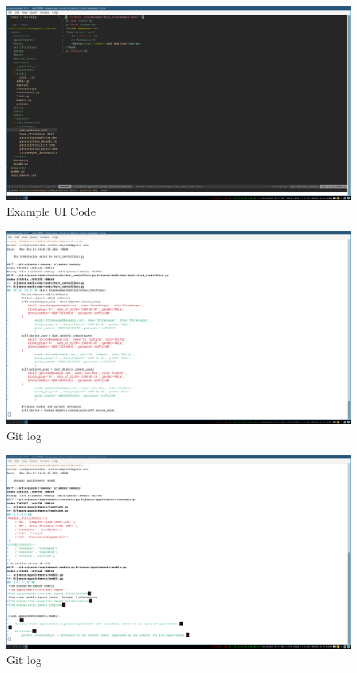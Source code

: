 \documentclass[a4paper,12pt]{article}
\begin{document}
\begin{figure}[H]
    \centering
    \includegraphics[width=1\textwidth]{images/meet202.png}   
    \caption{Example UI Code}
    \label{fig:meet202}
\end{figure}
\begin{figure}[H]
    \centering
    \includegraphics[width=1\textwidth]{images/meet31.png}   
    \caption{Git log}
    \label{fig:meet31}
\end{figure}
\begin{figure}[H]
    \centering
    \includegraphics[width=1\textwidth]{images/meet32.png}   
    \caption{Git log}
    \label{fig:meet32}
\end{figure}
\end{document}
